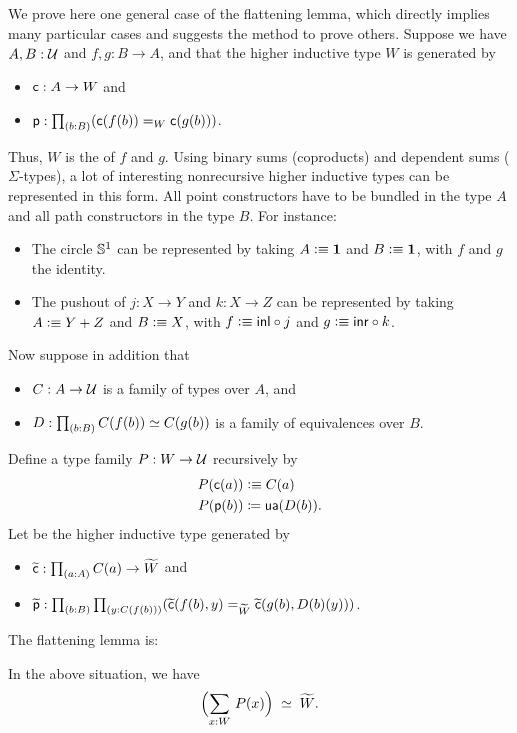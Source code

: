 We prove here one general case of the flattening lemma, which directly implies many particular cases and suggests the method to prove others.
Suppose we have $A,B:\mathcal{U}$ and $f,g:B\to{}A$, and that the higher inductive type $W$ is generated by
\begin{itemize}
\item $\mathsf{c}:A\to{}W$ and
\item $\pp:\prd{b:B} (\cc(f(b))=_W\cc(g(b)))$.
\end{itemize}
Thus, $W$ is the 
%
%
of $f$ and $g$.
Using binary sums (coproducts) and dependent sums ($\Sigma$-types), a lot of interesting nonrecursive higher
inductive types can be represented in this form. All point constructors have to
be bundled in the type $A$ and all path constructors in the type $B$.
For instance:
\begin{itemize}
\item The circle $\mathbb{S}^1$ can be represented by taking $A\vcentcolon\equiv \mathbf{1}$ and $B\vcentcolon\equiv \mathbf{1}$, with $f$ and $g$ the identity.
\item The pushout of $j:X\to Y$ and $k:X\to Z$ can be represented by taking $A\vcentcolon\equiv Y+Z$ and $B\vcentcolon\equiv X$, with $f\vcentcolon\equiv {\mathsf{inl}} \circ j$ and $g\vcentcolon\equiv {\mathsf{inr}}\circ k$.
\end{itemize}
Now suppose in addition that
\begin{itemize}
\item $C:A\to\mathcal{U}$ is a family of types over $A$, and
\item $D:\prd{b:B}\eqv{C(f(b))}{C(g(b))}$ is a family of equivalences over $B$.
\end{itemize}
Define a type family $P : W\to\mathcal{U}$ recursively by
\begin{align*}
  P(\mathsf{c}(a)) &\vcentcolon\equiv C(a)\\
  {P}\mathopen{}\left({\mathsf{p}(b)}\right)\mathclose{} &\coloneqq \mathsf{ua}(D(b)).
\end{align*}
Let \Wtil be the higher inductive type generated by
\begin{itemize}
\item $\cct:\prd{a:A} C(a) \to \Wtil$ and
\item $\ppt:\prd{b:B}{y:C(f(b))} (\cct(f(b),y)=_{\Wtil}\cct(g(b),D(b)(y)))$.
\end{itemize}

The flattening lemma is:

\begin{lem}\label{thm:flattening}
  In the above situation, we have
  \[ \eqvspaced{\Parens{\sm{x:W} P(x)}}{\widetilde{W}}. \]
\end{lem}

